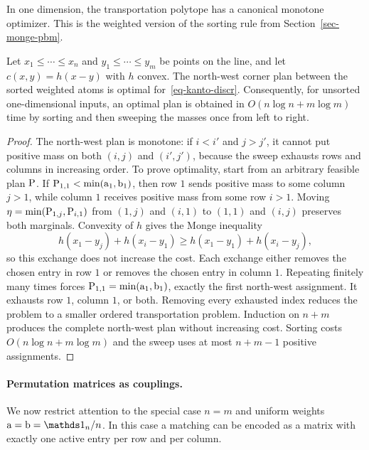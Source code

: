 In one dimension, the transportation polytope has a canonical monotone optimizer. This is the weighted version of the sorting rule from Section~\ref{sec-monge-pbm}.

\begin{prop}\label{prop-1d-weighted-sweep}
	Let $x_1\leq\cdots\leq x_n$ and $y_1\leq\cdots\leq y_m$ be points on the line, and let $c(x,y)=h(x-y)$ with $h$ convex. The north-west corner plan between the sorted weighted atoms is optimal for~\eqref{eq-kanto-discr}. Consequently, for unsorted one-dimensional inputs, an optimal plan is obtained in $O(n\log n+m\log m)$ time by sorting and then sweeping the masses once from left to right.
\end{prop}
\begin{proof}
		The north-west plan is monotone: if $i<i'$ and $j>j'$, it cannot put positive mass on both $(i,j)$ and $(i',j')$, because the sweep exhausts rows and columns in increasing order. To prove optimality, start from an arbitrary feasible plan $\P$. If
		$\P_{1,1}<\min(\a_1,\b_1)$, then row $1$ sends positive mass to some column $j>1$, while column $1$ receives positive mass from some row $i>1$. Moving
		\(\eta=\min(\P_{1,j},\P_{i,1})\)
		from $(1,j)$ and $(i,1)$ to $(1,1)$ and $(i,j)$ preserves both marginals. Convexity of $h$ gives the Monge inequality
		\[
			h(x_1-y_j)+h(x_i-y_1)
			\geq
			h(x_1-y_1)+h(x_i-y_j),
		\]
		so this exchange does not increase the cost. Each exchange either removes the chosen entry in row $1$ or removes the chosen entry in column $1$. Repeating finitely many times forces
		$\P_{1,1}=\min(\a_1,\b_1)$, exactly the first north-west assignment. It exhausts row $1$, column $1$, or both. Removing every exhausted index reduces the problem to a smaller ordered transportation problem. Induction on $n+m$ produces the complete north-west plan without increasing cost. Sorting costs $O(n\log n+m\log m)$ and the sweep uses at most $n+m-1$ positive assignments.
\end{proof}


\paragraph{Permutation matrices as couplings.}

We now restrict attention to the special case $n=m$ and uniform weights $\a=\b=\ones_n/n$. In this case a matching can be encoded as a matrix with exactly one active entry per row and per column.

